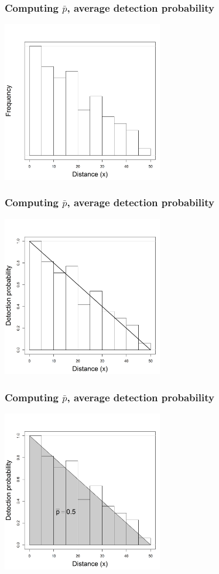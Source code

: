 \documentclass[color=usenames,dvipsnames,handout]{beamer}\usepackage[]{graphicx}\usepackage[]{xcolor}
\begin{document}
\begin{frame}
  \frametitle{Computing $\bar{p}$, average detection probability}
\begin{center}
  \includegraphics[width=7cm]{figs/detfun0-1}
\end{center}
\end{frame}




\begin{frame}
  \frametitle{Computing $\bar{p}$, average detection probability}
\begin{center}
  \includegraphics[width=7cm]{figs/detfun0-2}
\end{center}
\end{frame}



\begin{frame}
  \frametitle{Computing $\bar{p}$, average detection probability}
\begin{center}
  \includegraphics[width=7cm]{figs/detfun0-3}
\end{center}
\end{frame}
\end{document}
